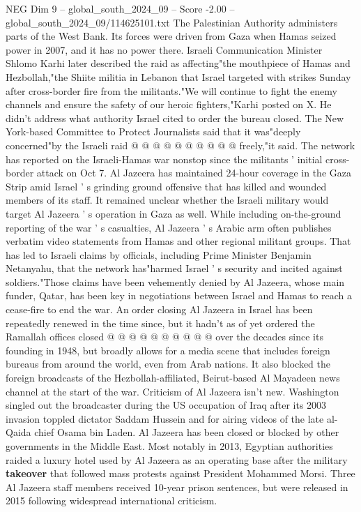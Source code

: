 \begin{textsample}{NEG Dim 9 – global\_south\_2024\_09 – Score -2.00 – global\_south\_2024\_09/114625101.txt}
The Palestinian Authority administers parts of the West Bank.
Its forces were driven from Gaza when Hamas seized power in 2007, and it has no power there.
Israeli Communication Minister Shlomo Karhi later described the raid as affecting"the mouthpiece of Hamas and Hezbollah,"the Shiite militia in Lebanon that Israel targeted with strikes Sunday after cross-border fire from the militants."We will continue to fight the enemy channels and ensure the safety of our heroic fighters,"Karhi posted on X.
He didn't address what authority Israel cited to order the bureau closed.
The New York-based Committee to Protect Journalists said that it was"deeply concerned"by the Israeli raid @ @ @ @ @ @ @ @ @ @ freely,"it said.
The network has reported on the Israeli-Hamas war nonstop since the militants ' initial cross-border attack on Oct 7.
Al Jazeera has maintained 24-hour coverage in the Gaza Strip amid Israel ' s grinding ground offensive that has killed and wounded members of its staff.
It remained unclear whether the Israeli military would target Al Jazeera ' s operation in Gaza as well.
While including on-the-ground reporting of the war ' s casualties, Al Jazeera ' s Arabic arm often publishes verbatim video statements from Hamas and other regional militant groups.
That has led to Israeli claims by officials, including Prime Minister Benjamin Netanyahu, that the network has"harmed Israel ' s security and incited against soldiers."Those claims have been vehemently denied by Al Jazeera, whose main funder, Qatar, has been key in negotiations between Israel and Hamas to reach a cease-fire to end the war.
An order closing Al Jazeera in Israel has been repeatedly renewed in the time since, but it hadn't as of yet ordered the Ramallah offices closed @ @ @ @ @ @ @ @ @ @ over the decades since its founding in 1948, but broadly allows for a media scene that includes foreign bureaus from around the world, even from Arab nations.
It also blocked the foreign broadcasts of the Hezbollah-affiliated, Beirut-based Al Mayadeen news channel at the start of the war.
Criticism of Al Jazeera isn't new.
Washington singled out the broadcaster during the US occupation of Iraq after its 2003 invasion toppled dictator Saddam Hussein and for airing videos of the late al-Qaida chief Osama bin Laden.
Al Jazeera has been closed or blocked by other governments in the Middle East.
Most notably in 2013, Egyptian authorities raided a luxury hotel used by Al Jazeera as an operating base after the military \textbf{takeover} that followed mass protests against President Mohammed Morsi.
Three Al Jazeera staff members received 10-year prison sentences, but were released in 2015 following widespread international criticism.

\end{textsample}
